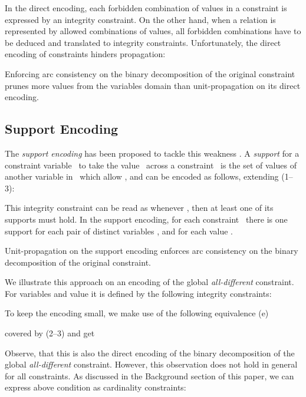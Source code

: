 \documentclass{tlp}
\begin{document}
In the direct encoding,
each forbidden combination of values in a constraint is expressed by an integrity constraint. On the other
hand, when a relation is represented by allowed combinations of values, all forbidden combinations have to be deduced and translated to integrity constraints. Unfortunately, the direct encoding of constraints hinders propagation:
\begin{theorem}[\citeNP{wa00}]
Enforcing arc consistency on the binary decomposition of the original constraint prunes more values from the variables domain than unit-propagation on its direct encoding.
\end{theorem}


\subsection{Support Encoding}

The \emph{support encoding} has been proposed to
tackle this weakness \cite{gent02}. A \emph{support} for a constraint variable~ to take the value~ across a constraint~ is the set of values  of another variable in~ which allow , and can be encoded as follows, extending (1--3):

This integrity constraint can be read as whenever , then at least one of its supports must hold.
In the support encoding, for each constraint~ there is one support for each pair of distinct variables , and for each value .
\begin{theorem} \label{thm:arc}
Unit-propagation on the support encoding enforces arc consistency on the binary decomposition of the original constraint.
\end{theorem}
We illustrate this approach on an encoding of the global \emph{all-different} constraint. For variables  and value  it is defined by the following  integrity constraints:

To keep the encoding small, we make use of the following equivalence (e)

covered by (2--3) and get

Observe, that this is also
the direct encoding of the binary decomposition of the global \emph{all-different} constraint. However, this observation does not hold in general for all constraints.
As discussed in the Background section of this paper, we can express above condition as  cardinality constraints:
\end{document}
